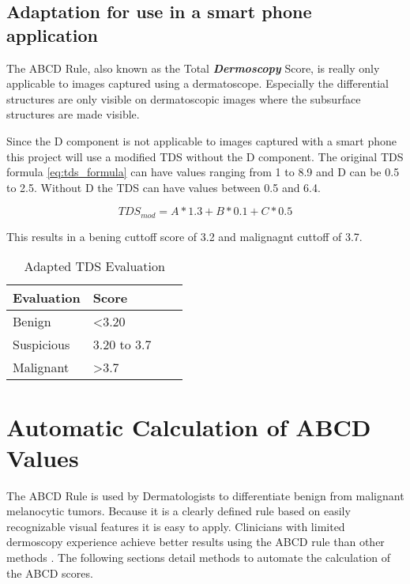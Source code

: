\subsection{Adaptation for use in a smart phone application}

The ABCD Rule, also known as the Total \textbf{\textit{Dermoscopy}} Score, is really only applicable to images captured using a dermatoscope. Especially the differential structures are only visible on dermatoscopic images where the subsurface structures are made visible\cite{Fernandez_Alcon_2009}.

Since the D component is not applicable to images captured with a smart phone this project will use a modified TDS without the D component. The original TDS formula \ref{eq:tds_formula} can have values ranging from 1 to 8.9 and D can be 0.5 to 2.5. Without D  the TDS can have values between 0.5 and 6.4.

\begin{equation}
\label{eq:tds_modified}
TDS_{mod} = A * 1.3 + B * 0.1 + C * 0.5
\end{equation}

This results in a bening cuttoff score of 3.2 and malignagnt cuttoff of 3.7.

\begin{table}[H]
\centering
\small
    \begin{tabular}{ | l | p{3.5cm} | l | p{3.5cm} |}
    \hline
    Evaluation & Score \\ \hline
    Benign & \textless  3.20  \\ \hline
    Suspicious & 3.20 to 3.7  \\ \hline
    Malignant & \textgreater  3.7  \\ \hline

    \end{tabular}

    \caption{Adapted TDS Evaluation}
    \label{fig:tds_mod_eval}

\end{table}


\section{Automatic Calculation of ABCD Values}

The ABCD Rule is used by Dermatologists to differentiate benign from malignant melanocytic tumors. Because it is a clearly defined rule based on easily recognizable visual features it is easy to apply. Clinicians with limited dermoscopy experience achieve better results using the ABCD rule than other methods \cite{Weigert_2012}. The following sections detail methods to automate the calculation of the ABCD scores.

